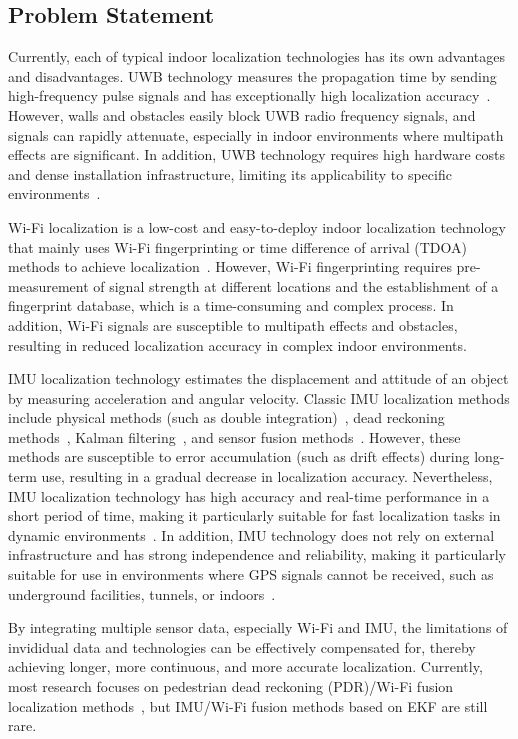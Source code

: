 \documentclass[12pt,a4paper]{article}
\numberwithin{equation}{section}
\begin{document}
\subsection{Problem Statement}
Currently, each of typical indoor localization technologies has its own
advantages and disadvantages. UWB technology measures the propagation time by
sending high-frequency pulse signals and has exceptionally high localization
accuracy~\cite{fontana2004recent}. However, walls and obstacles easily block UWB
radio frequency signals, and signals can rapidly attenuate, especially in indoor
environments where multipath effects are significant. In addition, UWB
technology requires high hardware costs and dense installation infrastructure,
limiting its applicability to specific environments~\cite{farahsari2022survey}.

Wi-Fi localization is a low-cost and easy-to-deploy indoor localization
technology that mainly uses Wi-Fi fingerprinting or time difference of arrival
(TDOA) methods to achieve
localization~\cite{yiu2017wireless,gustafsson2003positioning}. However, Wi-Fi
fingerprinting requires pre-measurement of signal strength at different
locations and the establishment of a fingerprint database, which is a
time-consuming and complex process. In addition, Wi-Fi signals are susceptible
to multipath effects and obstacles, resulting in reduced localization accuracy
in complex indoor environments.

IMU localization technology estimates the displacement and attitude of an object
by measuring acceleration and angular velocity. Classic IMU localization methods
include physical methods (such as double integration)~\cite{yan2018ridi}, dead
reckoning methods~\cite{jirawimut2003method}, Kalman
filtering~\cite{caron2006gps}, and sensor fusion
methods~\cite{dehzangi2017imu}. However, these methods are susceptible to error
accumulation (such as drift effects) during long-term use, resulting in a
gradual decrease in localization accuracy. Nevertheless, IMU localization
technology has high accuracy and real-time performance in a short period of
time, making it particularly suitable for fast localization tasks in dynamic
environments~\cite{marins2001improved}. In addition, IMU technology does not
rely on external infrastructure and has strong independence and reliability,
making it particularly suitable for use in environments where GPS signals cannot
be received, such as underground facilities, tunnels, or
indoors~\cite{wu2015indoor}.

By integrating multiple sensor data, especially Wi-Fi and IMU, the limitations
of invididual data and technologies can be effectively compensated for, thereby
achieving longer, more continuous, and more accurate localization. Currently,
most research focuses on pedestrian dead reckoning (PDR)/Wi-Fi
 fusion localization
methods~\cite{liu2021kalman}, but IMU/Wi-Fi fusion methods based on EKF are
still rare.
\end{document}
